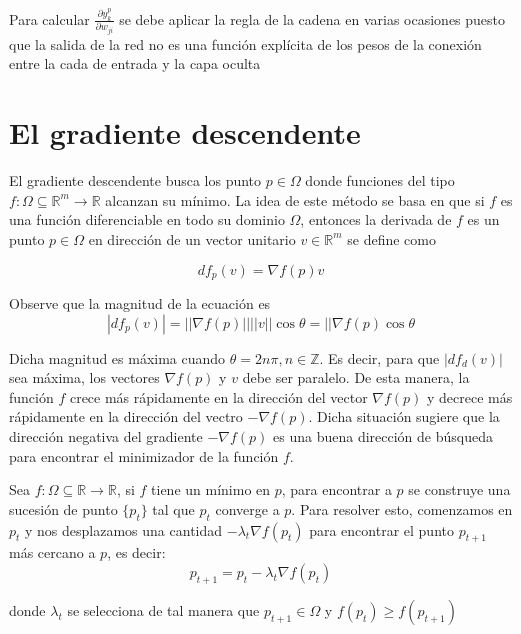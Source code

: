 Para calcular $\frac{\partial y_{k}^{p}}{\partial w_{ji}}$ se debe aplicar la regla de la cadena en varias ocasiones puesto que la salida de la red no es una función explícita de los pesos de la conexión entre la cada de entrada y la capa oculta
\newpage







\section{El gradiente descendente}%
El gradiente descendente busca los punto $p \in \Omega$ donde funciones del tipo $f: \Omega\subseteq\mathbb{R}^m \rightarrow \mathbb{R}$ alcanzan su mínimo. La idea de este método se basa en que si $f$ es una función diferenciable en todo su dominio $\Omega$, entonces la derivada de $f$ es un punto $p \in \Omega$ en dirección de un vector unitario $v \in \mathbb{R}^m$ se define como

$$ df_{p}(v) = \nabla f(p)v $$

Observe que la magnitud de la ecuación es
$$ |d f_{p}(v)| = ||\nabla f(p)|| ||v||\cos\theta = ||\nabla f(p)\cos\theta$$

Dicha magnitud es máxima cuando $\theta = 2n\pi, n \in \mathbb{Z}$. Es decir, para que $|df_{d}(v)|$ sea máxima, los vectores $\nabla f(p)$ y $v$ debe ser paralelo. De esta manera, la función $f$ crece más rápidamente en la dirección del vector $\nabla f(p)$ y decrece más rápidamente en la dirección del vectro $-\nabla f(p)$. Dicha situación sugiere que la dirección negativa del gradiente $-\nabla f(p)$ es una buena dirección de búsqueda para encontrar el minimizador de la función $f$.

Sea $f: \Omega \subseteq \mathbb{R} \rightarrow \mathbb{R}$, si $f$ tiene un mínimo en $p$, para encontrar a $p$ se construye una sucesión de punto $\{p_{t}\}$ tal que $p_{t}$ converge a $p$. Para resolver esto, comenzamos en $p_{t}$ y nos desplazamos una cantidad $-\lambda_{t}\nabla f(p_{t})$ para encontrar el punto $p_{t + 1}$ más cercano a $p$, es decir:
$$ p_{t + 1} =p_{t} - \lambda _{t}\nabla f(p_{t}) $$

donde $\lambda_{t}$ se selecciona de tal manera que $p_{t + 1} \in \Omega$ y $f(p_{t}) \geq f(p_{t + 1})$

